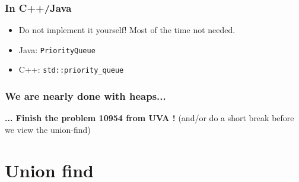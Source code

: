 \documentclass[10pt,svgnames,usenames,table]{beamer} %
\begin{document}
\begin{frame}[fragile]
  \frametitle{In C++/Java}
  \begin{itemize}
    \item Do not implement it yourself! Most of the time not needed.
    \item Java: \verb|PriorityQueue|
    \item C++: \verb|std::priority_queue|
  \end{itemize}
\end{frame}

\begin{frame}[fragile]
  \frametitle{We are nearly done with heaps...}
  \begin{center}
  {\LARGE \textbf{... Finish the problem 10954 from UVA !}}
  (and/or do a short break before we view the union-find)
  \end{center}
\end{frame}

\section{Union find}
\end{document}
